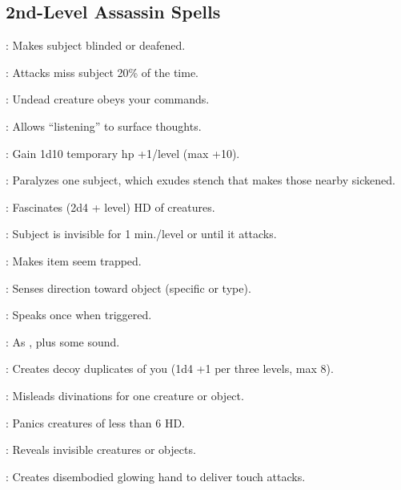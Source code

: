 \begin{multicols}{2}
\subsection{2nd-Level Assassin Spells}
\begin{description*}
\item[\linkspell{Blindness/Deafness}:] Makes subject blinded or deafened.
\item[\linkspell{Blur}:] Attacks miss subject 20\% of the time.
\item[\linkspell{Command Undead}:] Undead creature obeys your commands.
\item[\linkspell{Detect Thoughts}:] Allows “listening” to surface thoughts.
\item[\linkspell{False Life}:] Gain 1d10 temporary hp +1/level (max +10).
\item[\linkspell{Ghoul Touch}:] Paralyzes one subject, which exudes stench that makes those nearby sickened.
\item[\linkspell{Hypnotic Pattern}:] Fascinates (2d4 + level) HD of creatures.
\item[\linkspell{Invisibility}:] Subject is invisible for 1 min./level or until it attacks.
\item[\linkspell{Leomund’s Trap}:] Makes item seem trapped.
\item[\linkspell{Locate Object}:] Senses direction toward object (specific or type).
\item[\linkspell{Magic Mouth}:] Speaks once when triggered.
\item[\linkspell{Minor Image}:] As , plus some sound.
\item[\linkspell{Mirror Image}:] Creates decoy duplicates of you (1d4 +1 per three levels, max 8).
\item[\linkspell{Misdirection}:] Misleads divinations for one creature or object.
\item[\linkspell{Scare}:] Panics creatures of less than 6 HD.
\item[\linkspell{See Invisibility}:] Reveals invisible creatures or objects.
\item[\linkspell{Spectral Hand}:] Creates disembodied glowing hand to deliver touch attacks.
\end{description*}


\end{multicols}

